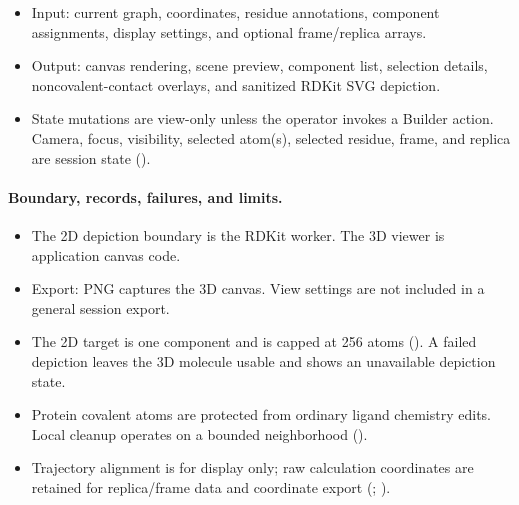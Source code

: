\documentclass[11pt]{article}
\begin{document}
\begin{small}
\begin{itemize}[leftmargin=*]

\item Input: current graph, coordinates, residue annotations, component assignments, display settings, and optional frame/replica arrays.

\end{itemize}

\begin{itemize}[leftmargin=*]

\item Output: canvas rendering, scene preview, component list, selection details, noncovalent-contact overlays, and sanitized RDKit SVG depiction.

\item State mutations are view-only unless the operator invokes a Builder action. Camera, focus, visibility, selected atom(s), selected residue, frame, and replica are session state ().

\end{itemize}

\paragraph{Boundary, records, failures, and limits.}

\begin{itemize}[leftmargin=*]

\item The 2D depiction boundary is the RDKit worker. The 3D viewer is application canvas code.

\item Export: PNG captures the 3D canvas. View settings are not included in a general session export.

\item The 2D target is one component and is capped at 256 atoms (). A failed depiction leaves the 3D molecule usable and shows an unavailable depiction state.

\item Protein covalent atoms are protected from ordinary ligand chemistry edits. Local cleanup operates on a bounded neighborhood ().

\item Trajectory alignment is for display only; raw calculation coordinates are retained for replica/frame data and coordinate export (; ).


\end{itemize}
\end{small}
\end{document}
